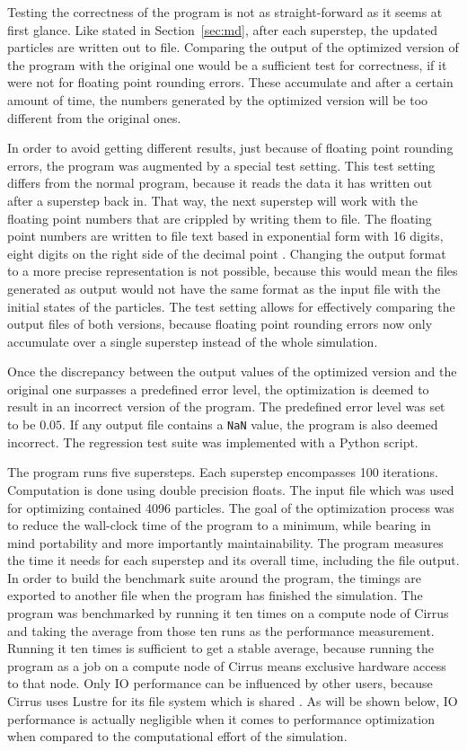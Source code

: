 \documentclass[twoside,11pt]{article}
\begin{document}
Testing the correctness of the program is not as straight-forward as
it seems at first glance.
Like stated in Section~\ref{sec:md}, after each superstep, the
updated particles are written out to file.
Comparing the output of the optimized version of the program with the
original one would be a sufficient test for correctness, if it were
not for floating point rounding errors.
These accumulate and after a certain amount of time, the numbers
generated by the optimized version will be too different from the
original ones.

In order to avoid getting different results, just because of floating
point rounding errors, the program was augmented by a special test
setting.
This test setting differs from the normal program, because it reads
the data it has written out after a superstep back in.
That way, the next superstep will work with the floating point numbers
that are crippled by writing them to file.
The floating point numbers are written to file text based in
exponential form with 16 digits, eight digits on the right side of the
decimal point \citep[see e.g.][for formatting IO in Fortran]
{fortran_formats}.
Changing the output format to a more precise representation is not
possible, because this would mean the files generated as output would
not have the same format as the input file with the initial states of
the particles.
The test setting allows for effectively comparing the output files of
both versions, because floating point rounding errors now only
accumulate over a single superstep instead of the whole simulation.

Once the discrepancy between the output values of the optimized
version and the original one surpasses a predefined error level,
the optimization is deemed to result in an incorrect version of the
program.
The predefined error level was set to be $0.05$.
If any output file contains a \texttt{NaN} value, the program is
also deemed incorrect.
The regression test suite was implemented with a Python script.

The program runs five supersteps.
Each superstep encompasses 100 iterations.
Computation is done using double precision floats.
The input file which was used for optimizing contained 4096 particles.
The goal of the optimization process was to reduce the wall-clock
time of the program to a minimum, while bearing in mind portability
and more importantly maintainability.
The program measures the time it needs for each superstep and its
overall time, including the file output.
In order to build the benchmark suite around the program, the timings
are exported to another file when the program has finished the
simulation.
The program was benchmarked by running it ten times on a compute node
of Cirrus and taking the average from those ten runs as the
performance measurement.
Running it ten times is sufficient to get a stable average,
because running the program as a job on a compute node of Cirrus
means exclusive hardware access to that node.
Only IO performance can be influenced by other users, because Cirrus
uses Lustre for its file system which is shared
\citep{cirrus_hardware}.
As will be shown below, IO performance is actually negligible when
it comes to performance optimization when compared to the
computational effort of the simulation.
\end{document}
